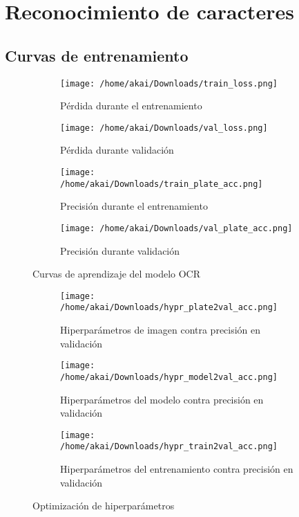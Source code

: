 \documentclass[12pt,a4paper]{article}
\begin{document}
\section{Reconocimiento de caracteres}

\subsection{Curvas de entrenamiento}

\begin{figure}[H]
	\centering
	\begin{subfigure}[b]{0.45\textwidth}
		\centering
		\texttt{[image: /home/akai/Downloads/train\_loss.png]}
		\caption{Pérdida durante el entrenamiento}
		\label{fig:train_loss}
	\end{subfigure}
	\hfill
	\begin{subfigure}[b]{0.45\textwidth}
		\centering
		\texttt{[image: /home/akai/Downloads/val\_loss.png]}
		\caption{Pérdida durante validación}
		\label{fig:val_loss}
	\end{subfigure}

	\begin{subfigure}[b]{0.45\textwidth}
		\centering
		\texttt{[image: /home/akai/Downloads/train\_plate\_acc.png]}
		\caption{Precisión durante el entrenamiento}
		\label{fig:train_accuracy}
	\end{subfigure}
	\hfill
	\begin{subfigure}[b]{0.45\textwidth}
		\centering
		\texttt{[image: /home/akai/Downloads/val\_plate\_acc.png]}
		\caption{Precisión durante validación}
		\label{fig:val_accuracy}
	\end{subfigure}

	\caption{Curvas de aprendizaje del modelo OCR}
	\label{fig:learning_curves_ocr}
\end{figure}

\begin{figure}[H]
	\begin{subfigure}[b]{0.5\textwidth}
		\centering
		\texttt{[image: /home/akai/Downloads/hypr\_plate2val\_acc.png]}
		\caption{Hiperparámetros de imagen contra precisión en validación}
		\label{fig:hypr_plate2val}
	\end{subfigure}
	\begin{subfigure}[b]{0.5\textwidth}
		\centering
		\texttt{[image: /home/akai/Downloads/hypr\_model2val\_acc.png]}
		\caption{Hiperparámetros del modelo contra precisión en validación}
		\label{fig:hypr_model2val}
	\end{subfigure}
	\begin{subfigure}[b]{0.5\textwidth}
		\centering
		\texttt{[image: /home/akai/Downloads/hypr\_train2val\_acc.png]}
		\caption{Hiperparámetros del entrenamiento contra precisión en validación}
		\label{fig:hypr_train2val}
	\end{subfigure}
	\caption{Optimización de hiperparámetros}
	\label{fig:hypr_opt}
\end{figure}
\end{document}
